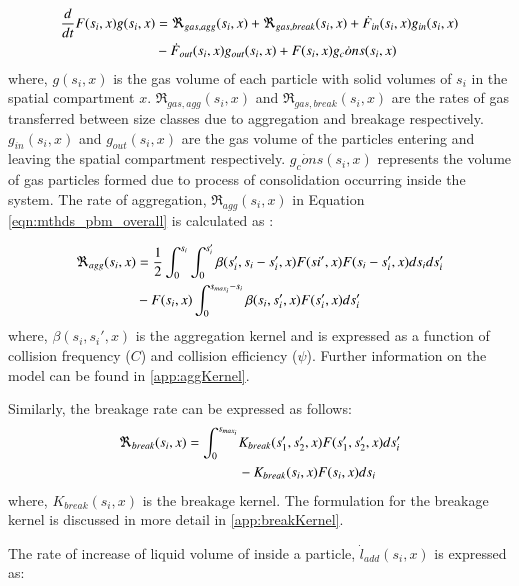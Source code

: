\documentclass[preprint,10pt,authoryear,review]{elsarticle}
\begin{document}
\begin{align}
\frac{d}{dt}F(s_i,x)g(s_i,x)&= 
\Re_{gas,agg}(s_i,x)+\Re_{gas,break}(s_i,x)+\dot{F}_{in}(s_i,x)g_{in}(s_i,x)\notag\\
&-\dot{F}_{out}(s_i,x)g_{out}(s_i,x)+F(s_i,x)\dot{g_cons}(s_i,x)
\label{eqn:mthds_pbm_gas_agg} 
\end{align}
where, $g(s_i,x)$ is the gas volume of each particle with solid volumes of $s_i$ 
in the spatial compartment $x$. $\Re_{gas,agg}(s_i,x)$ and $\Re_{gas,break}(s_i,x)$ are 
the rates of gas transferred between size classes due to aggregation and breakage respectively. 
$g_{in}(s_i,x)$ and $g_{out}(s_i,x)$ are the gas volume of the particles entering and 
leaving the spatial compartment respectively. $\dot{g_cons}(s_i,x)$ represents the volume of 
gas particles formed due to process of consolidation occurring inside the system. The 
rate of aggregation, $\Re_{agg}(s_i,x)$ in Equation \ref{eqn:mthds_pbm_overall} is 
calculated as \citep{Chaturbedi2017}:

\begin{align}
\Re_{agg}(s_i,x)&= \frac{1}{2}\int _0^{s_i} \int _0^{s_i'} 
\beta(s_i',s_i-s_i',x)F(si',x)F(s_i-s_i',x)ds_ids_i'\notag\\ 
&- F(s_i,x)\int _0^{s_{max_i}-s_i} 
\beta(s_i,s_i',x)F(s_i',x)ds_i'
\label{eqn:mthds_R_agg}
\end{align}
where, $\beta(s_i, s_i',x)$ is the aggregation kernel and is expressed as a 
function of collision frequency ($C$) and collision efficiency ($\psi$). Further 
information on the model can be found in \ref{app:aggKernel}.

Similarly, the breakage rate can be expressed as follows:
\begin{align}
\Re_{break}(s_i,x)  = \int_0^{s_{max_i}} & \notag
K_{break}(s_1',s_2',x)F(s_1',s_2',x)ds_i' \\ &  - K_{break}(s_i,x)F(s_i,x)ds_i
\label{eqn:mthds_pbm_breakage_geneq}
\end{align}   
where, $K_{break}(s_i,x)$ is the breakage kernel. The formulation for the breakage 
kernel is discussed in more detail in \ref{app:breakKernel}.

The rate of increase of liquid volume of inside a particle, 
$\dot{l}_{add}(s_i,x)$ is expressed as:
\end{document}
